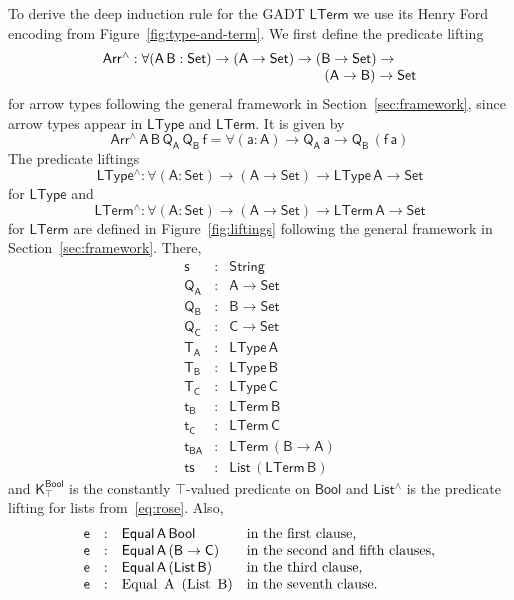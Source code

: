 \documentclass[sigplan,10pt]{acmart}
\begin{document}
To derive the deep induction rule for the GADT $\mathsf{LTerm}$ we use
its Henry Ford encoding from Figure~\ref{fig:type-and-term}.
We first define the predicate lifting
\[\begin{array}{l}
\mathsf{Arr^{\wedge} : \forall (A\, B : Set) \to (A \to Set) \to (B
  \to Set) \to}\\
\mathsf{\hspace*{2.2in}(A \to B) \to Set}
\end{array}\] for arrow types following the general framework in
Section~\ref{sec:framework}, since 
arrow types appear in $\mathsf{LType}$ and $\mathsf{LTerm}$.  It is
given by \[\mathsf{Arr^{\wedge}\, A\, B\, Q_A\, Q_B\, f = \forall (a :
  A) \to Q_A\,a \to Q_B\, (f\,a)}\] The predicate liftings
\[\mathsf{LType^{\wedge} : \forall (A : Set) \to (A \to Set) \to
  LType\,A \to Set}\] for $\mathsf{LType}$ and
\[\mathsf{LTerm^{\wedge}
  : \forall (A : Set) \to (A \to Set) \to LTerm\,A \to Set}\] for
$\mathsf{LTerm}$ are defined in Figure~\ref{fig:liftings} following
the general framework in Section~\ref{sec:framework}.  There,
\[
\begin{array}{lll}
\mathsf{s} & : & \mathsf{String} \\
\mathsf{Q_A} & : & \mathsf{A \to Set} \\
\mathsf{Q_B} & : & \mathsf{B \to Set} \\
\mathsf{Q_C} & : & \mathsf{C \to Set} \\
\mathsf{T_A} & : & \mathsf{LType\, A} \\
\mathsf{T_B} & : & \mathsf{LType\, B} \\
\mathsf{T_C} & : & \mathsf{LType\, C} \\
\mathsf{t_B} & : & \mathsf{LTerm \, B} \\
\mathsf{t_C} & : & \mathsf{LTerm \, C} \\
\mathsf{t_{BA}} & : & \mathsf{LTerm \, (B \to A)} \\
\mathsf{ts} & : & \mathsf{List\, (LTerm\, B)}
\end{array}
\]
and $\mathsf{K^{Bool}_{\top}}$ is the constantly
$\mathsf{\top}$-valued predicate on $\mathsf{Bool}$ and
$\mathsf{List^\wedge}$ is the predicate lifting for lists
from~\eqref{eq:rose}.  Also,
\[
\begin{array}{llll}
\mathsf{e} & : & \mathsf{Equal\,A\,Bool} & \text{in the first clause,} \\
\mathsf{e} & : & \mathsf{Equal\, A\, (B \to C)} & \text{in the second and fifth clauses,} \\
\mathsf{e} & : & \mathsf{Equal\, A\, (List\, B)} & \text{in the third clause,} \\
\mathsf{e} & : & \text{Equal\, A\, (List \,B)} & \text{in the seventh clause.}
\end{array}
\]
\end{document}
